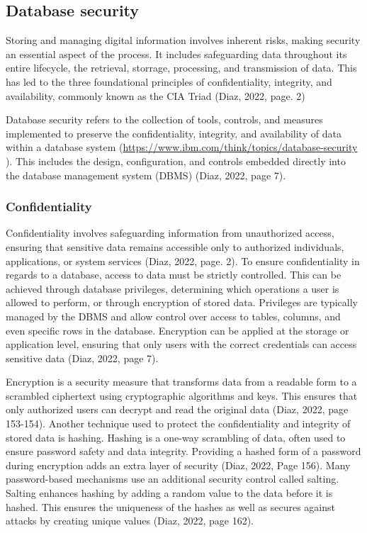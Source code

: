
\subsection{Database security}

Storing and managing digital information involves inherent risks, making security an essential aspect of the process. It includes safeguarding data throughout its entire lifecycle, the retrieval, storrage, processing, and transmission of data. This has led to the three foundational principles of confidentiality, integrity, and availability, commonly known as the CIA Triad (Diaz, 2022, page. 2)

Database security refers to the collection of tools, controls, and measures implemented to preserve the confidentiality, integrity, and availability of data within a database system (\href{https://www.ibm.com/think/topics/database-security}{https://www.ibm.com/think/topics/database-security} ). This includes the design, configuration, and controls embedded directly into the database management system (DBMS) (Diaz, 2022, page 7). 

\subsubsection{Confidentiality}

Confidentiality involves safeguarding information from unauthorized access, ensuring that sensitive data remains accessible only to authorized individuals, applications, or system services (Diaz, 2022, page. 2).  To ensure confidentiality in regards to a database, access to data must be strictly controlled. This can be achieved through database privileges, determining which operations a user is allowed to perform, or through encryption of stored data. Privileges are typically managed by the DBMS and allow control over access to tables, columns, and even specific rows in the database. Encryption can be applied at the storage or application level, ensuring that only users with the correct credentials can access sensitive data (Diaz, 2022, page 7).

Encryption is a security measure that transforms data from a readable form to a scrambled ciphertext using cryptographic algorithms and keys. This ensures that only authorized users can decrypt and read the original data (Diaz, 2022, page 153-154). Another technique used to protect the confidentiality and integrity of stored data is hashing. Hashing is a one-way scrambling of data, often used to ensure password safety and data integrity. Providing a hashed form of a password during encryption adds an extra layer of security (Diaz, 2022, Page 156). Many password-based mechanisms use an additional security control called salting. Salting enhances hashing by adding a random value to the data before it is hashed. This ensures the uniqueness of the hashes as well as secures against attacks by creating unique values (Diaz, 2022, page 162).

